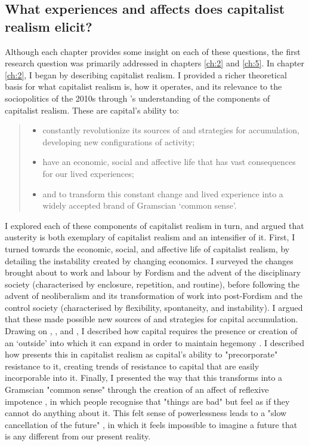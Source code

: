 \subsection{What experiences and affects does capitalist realism elicit?}
\label{subsec:9-2-1}
Although each chapter provides some insight on each of these questions, the first research question was primarily addressed in chapters \ref{ch:2} and \ref{ch:5}. In chapter \ref{ch:2}, I began by describing capitalist realism. I provided a richer theoretical basis for what capitalist realism is, how it operates, and its relevance to the sociopolitics of the 2010s through \citet[p. 6]{shonkwiler_reading_2014}’s understanding of the components of capitalist realism. These are capital’s ability to:
\begin{quote}
\begin{itemize}
\item  constantly revolutionize its sources of and strategies for accumulation, developing new configurations of activity;
\item have an economic, social and affective life that has vast consequences for our lived experiences;
\item and to transform this constant change and lived experience into a widely accepted brand of Gramscian `common sense'.
\end{itemize}
\end{quote}
I explored each of these components of capitalist realism in turn, and argued that austerity is both exemplary of capitalist realism and an intensifier of it. First, I turned towards the economic, social, and affective life of capitalist realism, by detailing the instability created by changing economics. I surveyed the changes brought about to work and labour by Fordism and the advent of the disciplinary society (characterised by enclosure, repetition, and routine), before following the advent of neoliberalism and its transformation of work into post-Fordism and the control society (characterised by flexibility, spontaneity, and instability). I argued that these made possible new sources of and strategies for capital accumulation. Drawing on \citet{marx_capital_2004}, \citet{luxemburg_accumulation_2015}, and \citet{harvey_new_2003}, I described how capital requires the presence or creation of an `outside' into which it can expand in order to maintain hegemony \citep{gramsci_selections_2007}. I described how \citet{fisher_capitalist_2009} presents this in capitalist realism as capital's ability to "precorporate" resistance to it, creating trends of resistance to capital that are easily incorporable into it. Finally, I presented the way that this transforms into a Gramscian "common sense" through the creation of an affect of reflexive impotence \citep[p. 24]{fisher_capitalist_2009}, in which people recognise that "things are bad" but feel as if they cannot do anything about it. This felt sense of powerlessness leads to a "slow cancellation of the future" \citep[p. 5]{fisher_ghosts_2014}, in which it feels impossible to imagine a future that is any different from our present reality.

